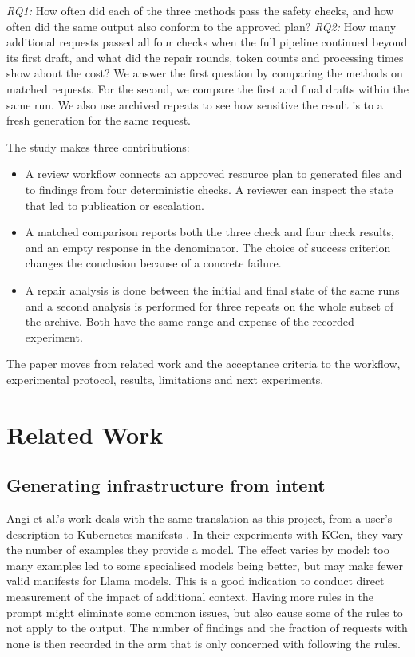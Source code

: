 \documentclass[12pt,onecolumn,draftclsnofoot]{IEEEtran}
\begin{document}
\emph{RQ1:} How often did each of the three methods pass the safety checks, and how often did the same output also conform to the approved plan? \emph{RQ2:} How many additional requests passed all four checks when the full pipeline continued beyond its first draft, and what did the repair rounds, token counts and processing times show about the cost? We answer the first question by comparing the methods on matched requests. For the second, we compare the first and final drafts within the same run. We also use archived repeats to see how sensitive the result is to a fresh generation for the same request.


The study makes three contributions:
\begin{itemize}
\item A review workflow connects an approved resource plan to generated files and to findings from four deterministic checks. A reviewer can inspect the state that led to publication or escalation.

\item A matched comparison reports both the three check and four check results, and an empty response in the denominator. The choice of success criterion changes the conclusion because of a concrete failure.

\item A repair analysis is done between the initial and final state of the same runs and a second analysis is performed for three repeats on the whole subset of the archive. Both have the same range and expense of the recorded experiment.
\end{itemize}
The paper moves from related work and the acceptance criteria to the workflow, experimental protocol, results, limitations and next experiments.


\section{Related Work}
\subsection{Generating infrastructure from intent}
Angi et al.'s work deals with the same translation as this project, from a user's description to Kubernetes manifests \cite{kgen}. In their experiments with KGen, they vary the number of examples they provide a model. The effect varies by model: too many examples led to some specialised models being better, but may make fewer valid manifests for Llama models. This is a good indication to conduct direct measurement of the impact of additional context. Having more rules in the prompt might eliminate some common issues, but also cause some of the rules to not apply to the output. The number of findings and the fraction of requests with none is then recorded in the arm that is only concerned with following the rules.
\end{document}

